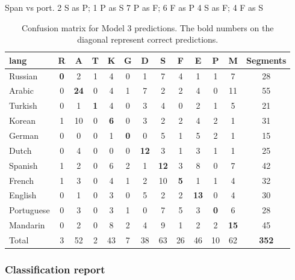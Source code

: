 \documentclass[11pt, letterpaper]{article}
\begin{document}
Span vs port.
2 S as P; 1 P as S
7 P as F; 6 F as P
4 S as F; 4 F as S


\begin{table}
\begin{center}
\caption{Confusion matrix for Model 3 predictions. The bold numbers on the diagonal represent correct predictions.}
\begin{tabular}{l | c c c c c c c c c c c || c}
lang			&R &A &T &K &G &D &S &F &E &P &M & Segments\\ \hline
Russian		&\textbf{0}  &2  &1  &4  &0  &1  &7  &4  &1  &1  &7 &28\\
Arabic		&0 &\textbf{24}  &0  &4  &1  &7  &2  &2  &4  &0 &11 &55\\
Turkish		&0  &1  &\textbf{1}  &4  &0  &3  &4  &0   &2  &1  &5 &21\\
Korean		&1 &10  &0  &\textbf{6}  &0  &3  &2  &2  &4  &2  &1 &31\\
German		&0  &0  &0  &1  &\textbf{0}  &0  &5  &1  &5  &2  &1 &15\\
Dutch		&0  &4  &0  &0  &0 &\textbf{12} & 3  &1  &3  &1  &1 &25\\
Spanish		&1  &2  &0  &6  &2  &1 &\textbf{12}  &3  &8  &0  &7 &42\\
French		&1  &3  &0  &4  &1  &2 &10 & \textbf{5}  &1  &1  &4 &32\\
English		&0  &1  &0  &3  &0  &5  &2  &2 &\textbf{13}  &0  &4 &30\\
Portuguese	&0  &3  &0  &3  &1  &0  &7  &5  &3  &\textbf{0}  &6 &28\\
Mandarin		&0  &2 & 0  &8  &2  &4  &9  &1  &2  &2 &\textbf{15} &45\\ \hline
Total			&3 &52 &2 &43 &7 &38 &63 &26 &46 &10 &62 &\textbf{352}\\

\end{tabular}
\label{tab:LangConfMat}
\end{center}
\end{table}

\subsubsection{Classification report}
\end{document}
